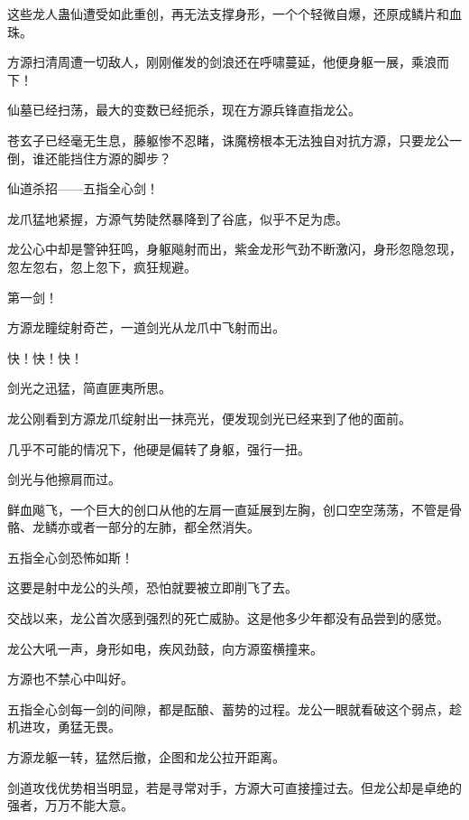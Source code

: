 \begin{this_body}
这些龙人蛊仙遭受如此重创，再无法支撑身形，一个个轻微自爆，还原成鳞片和血珠。

方源扫清周遭一切敌人，刚刚催发的剑浪还在呼啸蔓延，他便身躯一展，乘浪而下！

仙墓已经扫荡，最大的变数已经扼杀，现在方源兵锋直指龙公。

苍玄子已经毫无生息，藤躯惨不忍睹，诛魔榜根本无法独自对抗方源，只要龙公一倒，谁还能挡住方源的脚步？

仙道杀招——五指全心剑！

龙爪猛地紧握，方源气势陡然暴降到了谷底，似乎不足为虑。

龙公心中却是警钟狂鸣，身躯飚射而出，紫金龙形气劲不断激闪，身形忽隐忽现，忽左忽右，忽上忽下，疯狂规避。

第一剑！

方源龙瞳绽射奇芒，一道剑光从龙爪中飞射而出。

快！快！快！

剑光之迅猛，简直匪夷所思。

龙公刚看到方源龙爪绽射出一抹亮光，便发现剑光已经来到了他的面前。

几乎不可能的情况下，他硬是偏转了身躯，强行一扭。

剑光与他擦肩而过。

鲜血飚飞，一个巨大的创口从他的左肩一直延展到左胸，创口空空荡荡，不管是骨骼、龙鳞亦或者一部分的左肺，都全然消失。

五指全心剑恐怖如斯！

这要是射中龙公的头颅，恐怕就要被立即削飞了去。

交战以来，龙公首次感到强烈的死亡威胁。这是他多少年都没有品尝到的感觉。

龙公大吼一声，身形如电，疾风劲鼓，向方源蛮横撞来。

方源也不禁心中叫好。

五指全心剑每一剑的间隙，都是酝酿、蓄势的过程。龙公一眼就看破这个弱点，趁机进攻，勇猛无畏。

方源龙躯一转，猛然后撤，企图和龙公拉开距离。

剑道攻伐优势相当明显，若是寻常对手，方源大可直接撞过去。但龙公却是卓绝的强者，万万不能大意。

\end{this_body}

